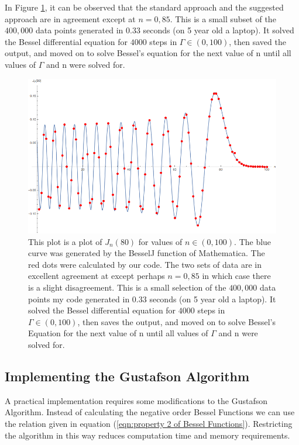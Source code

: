 \documentclass[onecolumn, groupedaddress, 10pt]{revtex4-1}
\begin{document}
In Figure \ref{fig:TA_bessel}, it can be observed that the standard approach and the suggested approach are in agreement except at $n=0,85$.  This is a small subset of the $400,000$ data points generated in $0.33$ seconds (on 5 year old a laptop).  It solved the Bessel differential equation for $4000$ steps in $\Gamma \in (0,100)$, then saved the output, and moved on to solve Bessel's equation for the next value of n until all values of $\Gamma$ and n were solved for.

\begin{figure}[H]
	\centering
	\includegraphics[width=.75\linewidth]{BesselJn80.png}
	\caption{This plot is a plot of $J_n(80)$ for values of $n\in (0,100)$.  The blue curve was generated by the BesselJ function of Mathematica.  The red dots were calculated by our code.  The two sets of data are in excellent agreement at except perhaps $n=0,85$ in which case there is a slight disagreement.  This is a small selection of the $400,000$ data points my code generated in $0.33$ seconds (on 5 year old a laptop).  It solved the Bessel differential equation for $4000$ steps in $\Gamma \in (0,100)$, then saves the output, and moved on to solve Bessel's Equation for the next value of n until all values of $\Gamma$ and n were solved for.\label{fig:TA_bessel} }
\end{figure}









\subsection{Implementing the Gustafson Algorithm}
A practical implementation requires some modifications to the Gustafson Algorithm.  Instead of calculating the negative order Bessel Functions we can use the relation given in equation (\ref{eqn:property 2 of Bessel Functions}).  Restricting the algorithm in this way reduces computation time and memory requirements.
\end{document}
